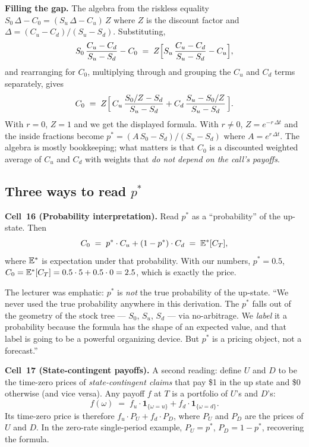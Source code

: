\begin{tipblock}
\textbf{Filling the gap.} The algebra from the riskless equality
$S_0\,\Delta - C_0 = (S_u\,\Delta - C_u)\,Z$ where $Z$ is the
discount factor and $\Delta = (C_u - C_d)/(S_u - S_d)$. Substituting,
\[
  S_0\,\frac{C_u - C_d}{S_u - S_d} - C_0 \;=\; Z\Bigl[S_u\,\frac{C_u - C_d}{S_u - S_d} - C_u\Bigr],
\]
and rearranging for $C_0$, multiplying through and grouping the $C_u$
and $C_d$ terms separately, gives
\[
  C_0 \;=\; Z\Bigl[\,C_u\,\frac{S_0/Z - S_d}{S_u - S_d}
                  + C_d\,\frac{S_u - S_0/Z}{S_u - S_d}\,\Bigr].
\]
With $r = 0$, $Z = 1$ and we get the displayed formula. With $r \ne 0$,
$Z = e^{-r\,\Delta t}$ and the inside fractions become
$p^* = (A\,S_0 - S_d)/(S_u - S_d)$ where $A = e^{r\,\Delta t}$. The
algebra is mostly bookkeeping; what matters is that $C_0$ is a
discounted weighted average of $C_u$ and $C_d$ with weights that
\emph{do not depend on the call's payoffs}.
\end{tipblock}

\subsection{Three ways to read $p^*$}\label{L8-sec:threereads}

\begin{keyblock}
\textbf{Cell~16 (Probability interpretation).}
Read $p^*$ as a ``probability'' of the up-state. Then
\[
  C_0 \;=\; p^* \cdot C_u + (1 - p^*)\cdot C_d \;=\; \mathbb{E}^{*}[C_T],
\]
where $\mathbb{E}^{*}$ is expectation under that probability. With our
numbers, $p^* = 0.5$, $C_0 = \mathbb{E}^{*}[C_T] = 0.5 \cdot 5 + 0.5 \cdot 0 = 2.5$,
which is exactly the price.
\end{keyblock}

The lecturer was emphatic: $p^*$ is \emph{not} the true probability
of the up-state. ``We never used the true probability anywhere in
this derivation. The $p^*$ falls out of the geometry of the stock
tree --- $S_0$, $S_u$, $S_d$ --- via no-arbitrage. We \emph{label}
it a probability because the formula has the shape of an expected
value, and that label is going to be a powerful organizing device.
But $p^*$ is a pricing object, not a forecast.''

\begin{keyblock}
\textbf{Cell~17 (State-contingent payoffs).}
A second reading: define $U$ and $D$ to be the time-zero prices of
\emph{state-contingent claims} that pay \$1 in the up state and \$0
otherwise (and vice versa). Any payoff $f$ at $T$ is a portfolio of
$U$'s and $D$'s:
\[
  f(\omega) \;=\; f_u\cdot \mathbf{1}_{\{\omega = u\}} + f_d \cdot \mathbf{1}_{\{\omega = d\}}.
\]
Its time-zero price is therefore $f_u \cdot P_U + f_d \cdot P_D$,
where $P_U$ and $P_D$ are the prices of $U$ and $D$. In the zero-rate
single-period example, $P_U = p^*$, $P_D = 1 - p^*$, recovering
the formula.
\end{keyblock}

